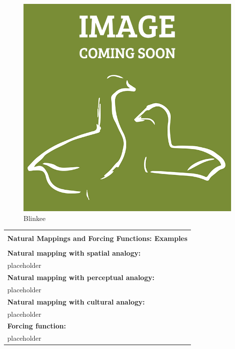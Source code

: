 \documentclass[a4paper,11pt,oneside]{scrreprt}
\begin{document}
\begin{figure}[H]
	\centering
	\includegraphics[clip, trim=0cm 0cm 0cm 0cm, scale=0.33]{./images/redesign.png}
	\caption{Blinkee}
	\label{fig:sub2}
\end{figure}

\clearpage


\begin{table}[h]
	\begin{tabularx}{\textwidth}{|X|}
		
		\hline
			\\
			\textbf{Natural Mappings and Forcing Functions: Examples} \\
			\\
		\hline
		
			\textbf{Natural mapping with spatial analogy:}			\\
			placeholder\\
			
		\hline
				
			\textbf{Natural mapping with perceptual analogy:}			\\
			placeholder\\
			
		\hline
		
			\textbf{Natural mapping with cultural analogy:}			\\
			placeholder\\
			
		\hline
		
			\textbf{Forcing function:}			\\
			placeholder\\
			
			\hline
		
		\hline
	\end{tabularx}
\end{table}
\end{document}
